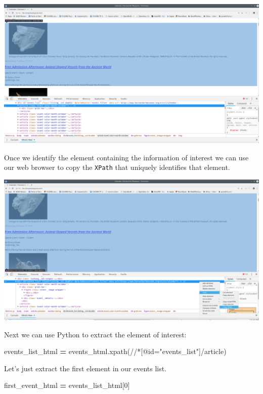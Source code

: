 \documentclass[
]{book}
\newenvironment{Shaded}{\begin{snugshade}}{\end{snugshade}}
\newcommand{\DecValTok}[1]{\textcolor[rgb]{0.00,0.00,0.81}{#1}}
\newcommand{\NormalTok}[1]{#1}
\newcommand{\OperatorTok}[1]{\textcolor[rgb]{0.81,0.36,0.00}{\textbf{#1}}}
\newcommand{\StringTok}[1]{\textcolor[rgb]{0.31,0.60,0.02}{#1}}
\begin{document}
\includegraphics{Python/PythonWebScrape/images/dev_tools_inspect.png}

Once we identify the element containing the information of interest we can use our web browser to copy the \texttt{XPath} that uniquely identifies that element.

\includegraphics{Python/PythonWebScrape/images/dev_tools_xpath.png}

Next we can use Python to extract the element of interest:

\begin{Shaded}
\begin{Highlighting}[]
\NormalTok{events\_list\_html }\OperatorTok{=}\NormalTok{ events\_html.xpath(}\StringTok{\textquotesingle{}//*[@id="events\_list"]/article\textquotesingle{}}\NormalTok{)}
\end{Highlighting}
\end{Shaded}

Let's just extract the first element in our events list.

\begin{Shaded}
\begin{Highlighting}[]
\NormalTok{first\_event\_html }\OperatorTok{=}\NormalTok{ events\_list\_html[}\DecValTok{0}\NormalTok{]}
\end{Highlighting}
\end{Shaded}
\end{document}
